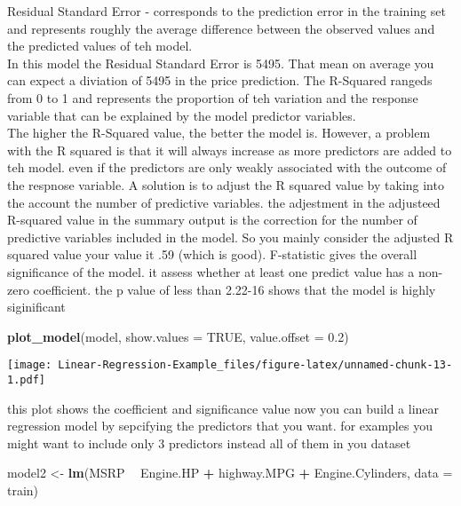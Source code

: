 \documentclass[
]{article}
\newenvironment{Shaded}{\begin{snugshade}}{\end{snugshade}}
\newcommand{\DataTypeTok}[1]{\textcolor[rgb]{0.13,0.29,0.53}{#1}}
\newcommand{\FloatTok}[1]{\textcolor[rgb]{0.00,0.00,0.81}{#1}}
\newcommand{\KeywordTok}[1]{\textcolor[rgb]{0.13,0.29,0.53}{\textbf{#1}}}
\newcommand{\NormalTok}[1]{#1}
\newcommand{\OperatorTok}[1]{\textcolor[rgb]{0.81,0.36,0.00}{\textbf{#1}}}
\newcommand{\OtherTok}[1]{\textcolor[rgb]{0.56,0.35,0.01}{#1}}
\newcommand{\StringTok}[1]{\textcolor[rgb]{0.31,0.60,0.02}{#1}}
\begin{document}
Residual Standard Error - corresponds to the prediction error in the
training set and represents roughly the average difference between the
observed values and the predicted values of teh model.\\
In this model the Residual Standard Error is 5495. That mean on average
you can expect a diviation of 5495 in the price prediction. The
R-Squared rangeds from 0 to 1 and represents the proportion of teh
variation and the response variable that can be explained by the model
predictor variables.\\
The higher the R-Squared value, the better the model is. However, a
problem with the R squared is that it will always increase as more
predictors are added to teh model. even if the predictors are only
weakly associated with the outcome of the respnose variable. A solution
is to adjust the R squared value by taking into the account the number
of predictive variables. the adjestment in the adjusteed R-squared value
in the summary output is the correction for the number of predictive
variables included in the model. So you mainly consider the adjusted R
squared value your value it .59 (which is good). F-statistic gives the
overall significance of the model. it assess whether at least one
predict value has a non-zero coefficient. the p value of less than
2.22-16 shows that the model is highly siginificant

\begin{Shaded}
\begin{Highlighting}[]
\KeywordTok{plot_model}\NormalTok{(model, }\DataTypeTok{show.values =} \OtherTok{TRUE}\NormalTok{, }\DataTypeTok{value.offset =} \FloatTok{0.2}\NormalTok{)}
\end{Highlighting}
\end{Shaded}

\texttt{[image: Linear-Regression-Example\_files/figure-latex/unnamed-chunk-13-1.pdf]}

this plot shows the coefficient and significance value now you can build
a linear regression model by sepcifying the predictors that you want.
for examples you might want to include only 3 predictors instead all of
them in you dataset

\begin{Shaded}
\begin{Highlighting}[]
\NormalTok{model2 <-}\StringTok{ }\KeywordTok{lm}\NormalTok{(MSRP }\OperatorTok{~}\StringTok{ }\NormalTok{Engine.HP }\OperatorTok{+}\StringTok{ }\NormalTok{highway.MPG }\OperatorTok{+}\StringTok{ }\NormalTok{Engine.Cylinders, }\DataTypeTok{data =}\NormalTok{ train)}
\end{Highlighting}
\end{Shaded}
\end{document}
